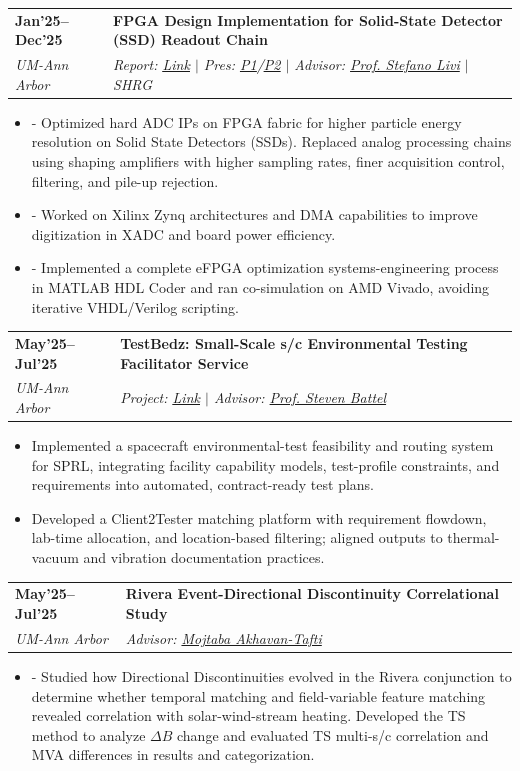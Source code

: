 \documentclass[letterpaper,11pt]{article}
\makeatletter
\newcommand{\resumeItem}[1]{
\item\small{#1}
}
\newlength{\leftcolwidth}
\newlength{\colgap}
\newlength{\rightcolindent}
\newcommand{\resumeSubheading}[4]{%
  \vspace{0pt}
\item[]
  \begin{tabularx}{\textwidth}{@{}>{\raggedleft\arraybackslash}p{\leftcolwidth}@{\hspace{\colgap}}>{\raggedright\arraybackslash}X@{}}
    \textbf{\small #2} & \textbf{#1} \\
    \textit{\small #4} & \textit{\small #3} \\
  \end{tabularx}\vspace{0pt}
}
\newcommand{\resumeItemListStart}{%
  \begin{itemize}[leftmargin=\rightcolindent, label={}, itemindent=0pt,
    itemsep=0.6mm, parsep=0pt, topsep=1pt, partopsep=0pt]}
\renewcommand{\resumeItem}[1]{
  \item\small{#1}}
\newcommand{\resumeItemListEnd}{
  \end{itemize}}
\makeatother
\begin{document}
\resumeSubheading
{FPGA Design Implementation for Solid-State Detector (SSD) Readout Chain}{Jan'25--Dec'25}
{Report: \href{https://drive.google.com/file/d/1cb_1Vx5w__6OxFU2j2_Tn59uFXkM9p9M/view?usp=sharing}{\underline{Link}} $|$ Pres: \href{https://drive.google.com/file/d/149WzLOPuB5uX1cVQB2b0kfdt1YkxJpFG/view?usp=sharing}{\underline{P1}}/\href{https://drive.google.com/file/d/1fP5PyrEaI2-hRiAlK8ebVCq7qUQ7X5Xv/view?usp=sharing}{\underline{P2}} $|$ Advisor: \href{https://clasp.engin.umich.edu/people/livi-stefano/}{Prof. Stefano Livi} $|$ SHRG}{UM-Ann Arbor}
\resumeItemListStart
\resumeItem{- Optimized hard ADC IPs on FPGA fabric for higher particle energy resolution on Solid State Detectors (SSDs). Replaced analog processing chains using shaping amplifiers with higher sampling rates, finer acquisition control, filtering, and pile-up rejection.}
\resumeItem{- Worked on Xilinx Zynq architectures and DMA capabilities to improve digitization in XADC and board power efficiency.}
\resumeItem{- Implemented a complete eFPGA optimization systems-engineering process in MATLAB HDL Coder and ran co-simulation on AMD Vivado, avoiding iterative VHDL/Verilog scripting.}
\resumeItemListEnd
\resumeSubheading
{TestBedz: Small-Scale s/c Environmental Testing Facilitator Service}{May'25--Jul'25}
{Project: \href{https://msehgal001.github.io/TestBedz/}{\underline{Link}} $|$ Advisor: \href{https://clasp.engin.umich.edu/people/battel-steven/}{Prof. Steven Battel}}{UM-Ann Arbor}
\resumeItemListStart
\resumeItem{Implemented a spacecraft environmental-test feasibility and routing system for SPRL, integrating facility capability models, test-profile constraints, and requirements into automated, contract-ready test plans.}
\resumeItem{Developed a Client2Tester matching platform with requirement flowdown, lab-time allocation, and location-based filtering; aligned outputs to thermal-vacuum and vibration documentation practices.}
\resumeItemListEnd

\resumeSubheading
{Rivera Event-Directional Discontinuity Correlational Study }{May'25--Jul'25}
{Advisor: \href{https://clasp.engin.umich.edu/people/akhavan-tafti-mojtaba/}{Mojtaba Akhavan-Tafti}}{UM-Ann Arbor}
\resumeItemListStart
\resumeItem{- Studied how Directional Discontinuities evolved in the Rivera conjunction to determine whether temporal matching and field-variable feature matching revealed correlation with solar-wind-stream heating. Developed the TS method to analyze \(\Delta B\) change and evaluated TS multi-s/c correlation and MVA differences in results and categorization.}
\resumeItemListEnd
\end{document}
